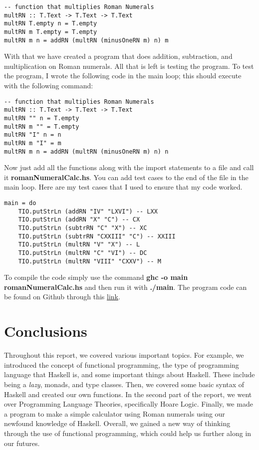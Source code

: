 \documentclass{article}
\begin{document}
\begin{lstlisting}
-- function that multiplies Roman Numerals
multRN :: T.Text -> T.Text -> T.Text
multRN T.empty n = T.empty
multRN m T.empty = T.empty
multRN m n = addRN (multRN (minusOneRN m) n) m
\end{lstlisting}

With that we have created a program that does addition, subtraction, and multiplication on Roman numerals. All that is left is testing the program. To test the program, I wrote the following code in the main loop; this should execute with the following command:
\begin{lstlisting}
-- function that multiplies Roman Numerals
multRN :: T.Text -> T.Text -> T.Text
multRN "" n = T.empty
multRN m "" = T.empty
multRN "I" n = n
multRN m "I" = m
multRN m n = addRN (multRN (minusOneRN m) n) n
\end{lstlisting}
Now just add all the functions along with the import statements to a file and call it \textbf{romanNumeralCalc.hs}. You can add test cases to the end of the file in the main loop. Here are my test cases that I used to ensure that my code worked.

\begin{lstlisting}
main = do
    TIO.putStrLn (addRN "IV" "LXVI") -- LXX
    TIO.putStrLn (addRN "X" "C") -- CX
    TIO.putStrLn (subtrRN "C" "X") -- XC
    TIO.putStrLn (subtrRN "CXXIII" "C") -- XXIII
    TIO.putStrLn (multRN "V" "X") -- L
    TIO.putStrLn (multRN "C" "VI") -- DC
    TIO.putStrLn (multRN "VIII" "CXXV") -- M
\end{lstlisting}

To compile the code simply use the command \textbf{ghc -o main romanNumeralCalc.hs} and then run it with \textbf{./main}. The program code can be found on Github through this \href{https://github.com/arielmata/CPSC354-Final/blob/main/Final/README.md}{link}.
\section{Conclusions}\label{conclusions}
Throughout this report, we covered various important topics. For example, we introduced the concept of functional programming, the type of programming language that Haskell is, and some important things about Haskell. These include being a \textit{lazy}, monads, and type classes. Then, we covered some basic syntax of Haskell and created our own functions. In the second part of the report, we went over Programming Language Theories, specifically Hoare Logic. Finally, we made a program to make a simple calculator using Roman numerals using our newfound knowledge of Haskell. Overall, we gained a new way of thinking through the use of functional programming, which could help us further along in our futures.
\end{document}
